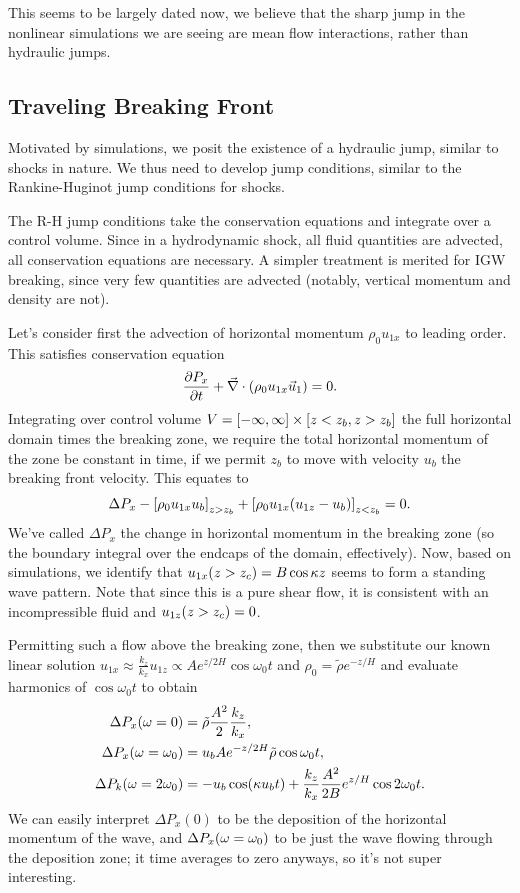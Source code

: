 \documentclass[11pt,
        usenames, %
        dvipsnames %
    ]{report}
\newcommand*{\pd}[2]{\frac{\partial#1}{\partial#2}}
\DeclarePairedDelimiter\p{\lparen}{\rparen}
\DeclarePairedDelimiter\s{\lbrack}{\rbrack}
\begin{document}
This seems to be largely dated now, we believe that the sharp jump in the
nonlinear simulations we are seeing are mean flow interactions, rather than
hydraulic jumps.

\subsection{Traveling Breaking Front}

Motivated by simulations, we posit the existence of a hydraulic jump, similar to
shocks in nature. We thus need to develop jump conditions, similar to the
Rankine-Huginot jump conditions for shocks.

The R-H jump conditions take the conservation equations and integrate over a
control volume. Since in a hydrodynamic shock, all fluid quantities are
advected, all conservation equations are necessary. A simpler treatment is
merited for IGW breaking, since very few quantities are advected (notably,
vertical momentum and density are not).

Let's consider first the advection of horizontal momentum $\rho_0 u_{1x}$ to
leading order. This satisfies conservation equation
\begin{equation}
    \pd{P_x}{t} + \vec{\nabla} \cdot \p*{\rho_0 u_{1x}\vec{u}_1} = 0.
\end{equation}
Integrating over control volume $V = \s*{-\infty, \infty} \times \s*{z < z_b, z
> z_b}$ the full horizontal domain times the breaking zone, we require the total
horizontal momentum of the zone be constant in time, if we permit $z_b$ to move
with velocity $u_b$ the breaking front velocity. This equates to
\begin{equation}
    \Delta P_x - \s*{\rho_0 u_{1x}u_b}_{z > z_b}
        + \s*{\rho_0 u_{1x}\p*{u_{1z} - u_b}}_{z < z_b} = 0.
\end{equation}
We've called $\Delta P_x$ the change in horizontal momentum in the breaking zone
(so the boundary integral over the endcaps of the domain, effectively). Now,
based on simulations, we identify that $u_{1x}\p*{z > z_c} = B\cos \kappa z$
seems to form a standing wave pattern. Note that since this is a pure shear
flow, it is consistent with an incompressible fluid and $u_{1z}\p*{z > z_c} =
0$.

Permitting such a flow above the breaking zone, then we substitute our known
linear solution $u_{1x} \approx \frac{k_z}{k_x} u_{1z} \propto Ae^{z / 2H}\cos
\omega_0 t$ and $\rho_0 = \tilde{\rho}e^{-z/H}$ and evaluate harmonics of $\cos
\omega_0 t$ to obtain
\begin{align}
    \Delta P_x\p*{\omega = 0} &= \tilde{\rho}\frac{A^2}{2}\frac{k_z}{k_x},\\
    \Delta P_x\p*{\omega = \omega_0}
        &= u_b Ae^{-z/2H}\tilde{\rho}\cos \omega_0 t,\\
    \Delta P_k(\omega = 2\omega_0) &=
        -u_b \cos (\kappa u_bt)
            + \frac{k_z}{k_x}\frac{A^2}{2B}e^{z/H} \cos 2 \omega_0 t.
\end{align}
We can easily interpret $\Delta P_x(0)$ to be the deposition of the horizontal
momentum of the wave, and $\Delta P_x\p*{\omega = \omega_0}$ to be just the wave
flowing through the deposition zone; it time averages to zero anyways, so it's
not super interesting.
\end{document}
